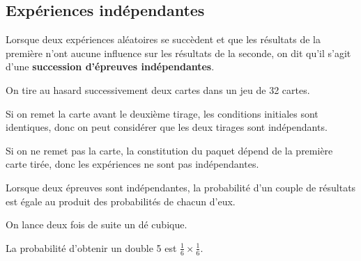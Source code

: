 \documentclass[a4paper,11pt]{article}
\begin{document}
\subsection{Expériences indépendantes}

\begin{cdefi}
Lorsque deux expériences aléatoires se succèdent et que les résultats de la première n'ont aucune influence sur les résultats de la seconde, on dit qu'il s'agit d'une \textbf{succession d'épreuves indépendantes}.
\end{cdefi}

\begin{cexemple}
On tire au hasard successivement deux cartes dans un jeu de 32 cartes.

Si on remet la carte avant le deuxième tirage, les conditions initiales sont identiques, donc on peut considérer que les deux tirages sont indépendants.

Si on ne remet pas la carte, la constitution du paquet dépend de la première carte tirée, donc les expériences ne sont pas indépendantes.
\end{cexemple}


\begin{cprop}[ (admise)]
Lorsque deux épreuves sont indépendantes, la probabilité d'un couple de résultats est égale au produit des probabilités de chacun d'eux.
\end{cprop}

\begin{cexemple}
On lance deux fois de suite un dé cubique.

La probabilité d'obtenir un double 5 est $\frac{1}{6} \times \frac{1}{6}$.
\end{cexemple}

\vfill{}
\end{document}
